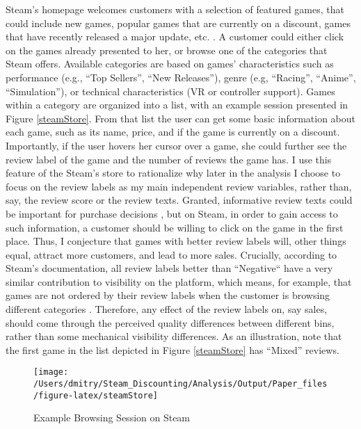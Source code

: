\documentclass[
  12pt,
  pagebackref]{article}
\begin{document}
Steam's homepage welcomes customers with a selection of featured games,
that could include new games, popular games that are currently on a
discount, games that have recently released a major update, etc.
\citep{steamVisibility}. A customer could either click on the games
already presented to her, or browse one of the categories that Steam
offers. Available categories are based on games' characteristics such as
performance (e.g., ``Top Sellers'', ``New Releases''), genre (e.g,
``Racing'', ``Anime'', ``Simulation''), or technical characteristics (VR
or controller support). Games within a category are organized into a
list, with an example session presented in Figure \ref{steamStore}. From
that list the user can get some basic information about each game, such
as its name, price, and if the game is currently on a discount.
Importantly, if the user hovers her cursor over a game, she could
further see the review label of the game and the number of reviews the
game has. I use this feature of the Steam's store to rationalize why
later in the analysis I choose to focus on the review labels as my main
independent review variables, rather than, say, the review score or the
review texts. Granted, informative review texts could be important for
purchase decisions \citep{ChevalierMayzlin06}, but on Steam, in order to
gain access to such information, a customer should be willing to click
on the game in the first place. Thus, I conjecture that games with
better review labels will, other things equal, attract more customers,
and lead to more sales. Crucially, according to Steam's documentation,
all review labels better than ``Negative`` have a very similar
contribution to visibility on the platform, which means, for example,
that games are not ordered by their review labels when the customer is
browsing different categories \citeyearpar{steamVisibility2}. Therefore,
any effect of the review labels on, say sales, should come through the
perceived quality differences between different bins, rather than some
mechanical visibility differences. As an illustration, note that the
first game in the list depicted in Figure \ref{steamStore} has ``Mixed''
reviews.

\begin{figure}[h]
 
 {\centering \texttt{[image: /Users/dmitry/Steam\_Discounting/Analysis/Output/Paper\_files/figure-latex/steamStore]} 
 
 }
 
 \caption{\label{steamStore}Example Browsing Session on Steam}\label{fig:unnamed-chunk-3}
 \end{figure}
\end{document}

